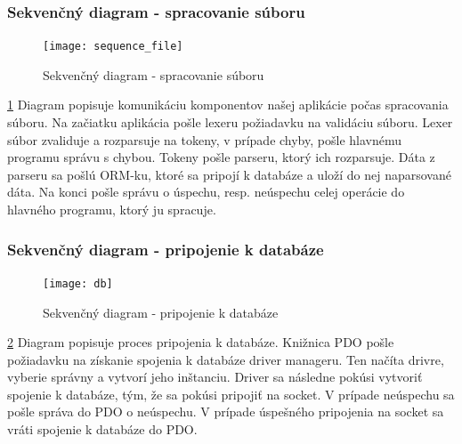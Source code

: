 \documentclass[12pt,a4paper]{article}
\begin{document}
\subsubsection{Sekvenčný diagram - spracovanie súboru}
\begin{figure}[H]
	\caption{Sekvenčný diagram - spracovanie súboru}
	\texttt{[image: sequence\_file]}
	\label{fig:seq}
\end{figure}
\ref{fig:seq}
Diagram popisuje komunikáciu komponentov našej aplikácie počas spracovania súboru. Na začiatku aplikácia pošle lexeru požiadavku na validáciu súboru. Lexer súbor zvaliduje a rozparsuje na tokeny, v prípade chyby, pošle hlavnému programu správu s chybou. Tokeny pošle parseru, ktorý ich rozparsuje. Dáta z parseru sa pošlú ORM-ku, ktoré sa pripojí k databáze a uloží do nej naparsované dáta. Na konci pošle správu o úspechu, resp. neúspechu celej operácie do hlavného programu, ktorý ju spracuje.

\subsubsection{Sekvenčný diagram -  pripojenie k databáze}
\begin{figure}[H]
	\caption{Sekvenčný diagram - pripojenie k databáze}
	\texttt{[image: db]}
	\label{fig:db}
\end{figure}
\ref{fig:db}
Diagram popisuje proces pripojenia k databáze. Knižnica PDO pošle požiadavku na získanie spojenia k databáze driver manageru. Ten načíta drivre, vyberie správny a vytvorí jeho inštanciu. Driver sa následne pokúsi vytvoriť spojenie k databáze, tým, že sa pokúsi pripojiť na socket. V prípade neúspechu sa pošle správa do PDO o neúspechu. V prípade úspešného pripojenia na socket sa vráti spojenie k databáze do PDO.
\end{document}

